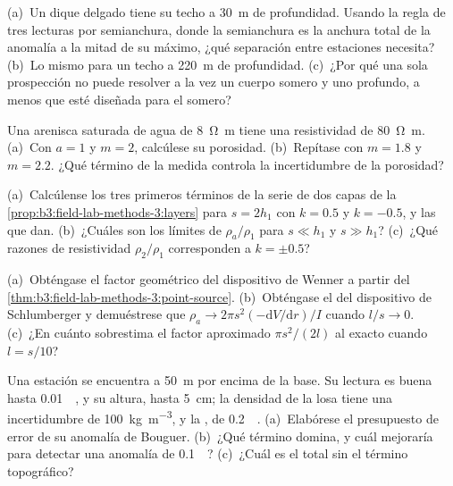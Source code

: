 \begin{exercise}[$\star\star$]\label{exo:b3:field-lab-methods-3:7}
(a)~Un dique delgado tiene su techo a \qty{30}{m} de profundidad. Usando la regla de tres
lecturas por semianchura, donde la semianchura es la anchura total de la
anomalía a la mitad de su máximo, ¿qué separación entre estaciones necesita? (b)~Lo
mismo para un techo a \qty{220}{m} de profundidad. (c)~¿Por qué una sola prospección no
puede resolver a la vez un cuerpo somero y uno profundo, a menos que esté diseñada
para el somero?
\end{exercise}

\begin{exercise}[$\star\star$]\label{exo:b3:field-lab-methods-3:8}
Una arenisca saturada de agua de \qty{8}{\ohm\metre} tiene una
resistividad de \qty{80}{\ohm\metre}. (a)~Con $a = 1$ y $m = 2$,
calcúlese su porosidad. (b)~Repítase con $m = 1.8$ y $m = 2.2$. ¿Qué
término de la medida controla la incertidumbre de la porosidad?
\end{exercise}

\begin{exercise}[$\star\star$]\label{exo:b3:field-lab-methods-3:9}
(a)~Calcúlense los tres primeros términos de la serie de dos capas de la
\cref{prop:b3:field-lab-methods-3:layers} para $s = 2h_1$ con $k =
\num{0.5}$ y $k = \num{-0.5}$, y las  que
dan. (b)~¿Cuáles son los límites de $\rho_a/\rho_1$ para $s \ll h_1$ y
$s \gg h_1$? (c)~¿Qué razones de resistividad $\rho_2/\rho_1$ corresponden a
$k = \pm 0.5$?
\end{exercise}

\begin{exercise}[$\star\star\star$]\label{exo:b3:field-lab-methods-3:10}
(a)~Obténgase el factor geométrico del dispositivo de Wenner a partir
del \cref{thm:b3:field-lab-methods-3:point-source}. (b)~Obténgase el del
dispositivo de Schlumberger y demuéstrese que $\rho_a \to 2\pi s^2(-\mathrm{d}V/
\mathrm{d}r)/I$ cuando $l/s \to 0$. (c)~¿En cuánto sobrestima el factor aproximado
$\pi s^2/(2l)$ al exacto cuando $l = s/10$?
\end{exercise}

\begin{exercise}[$\star\star\star$]\label{exo:b3:field-lab-methods-3:11}
Una estación se encuentra a \qty{50}{m} por encima de la base. Su lectura es buena hasta
\qty{0.01}{\milli\gal}, y su altura, hasta \qty{5}{cm}; la densidad de la
losa tiene una incertidumbre de \qty{100}{kg.m^{-3}}, y la , de
\qty{0.2}{\milli\gal}. (a)~Elabórese el presupuesto de error de su
anomalía de Bouguer. (b)~¿Qué término domina, y cuál mejoraría para
detectar una anomalía de \qty{0.1}{\milli\gal}? (c)~¿Cuál es el total sin
el término topográfico?
\end{exercise}


